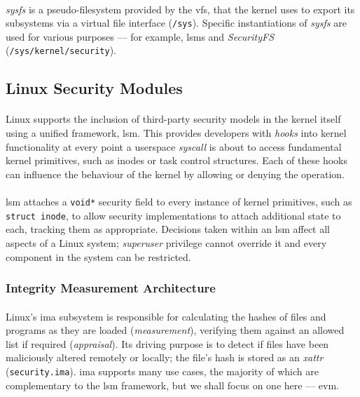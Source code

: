 \paragraph{} \textit{sysfs} is a pseudo-filesystem provided by the \acrshort{vfs}, that the kernel uses to export its subsystems via a virtual file interface (\texttt{/sys}). Specific instantiations of \textit{sysfs} are used for various purposes --- for example, \acrshort{lsm}s and \textit{SecurityFS} (\texttt{/sys/kernel/security}).



\subsection{Linux Security Modules}
\label{sec:lsm}

\paragraph{} Linux supports the inclusion of third-party security models in the kernel itself using a unified framework, \acrshort{lsm}. This provides developers with \textit{hooks} into kernel functionality at every point a userspace \textit{syscall} is about to access fundamental kernel primitives, such as inodes or task control structures. Each of these hooks can influence the behaviour of the kernel by allowing or denying the operation.

\paragraph{} \acrshort{lsm} attaches a \texttt{void*} security field to every instance of kernel primitives, such as \texttt{struct inode}, to allow security implementations to attach additional state to each, tracking them as appropriate. Decisions taken within an \acrshort{lsm} affect all aspects of a Linux system; \textit{superuser} privilege cannot override it and every component in the system can be restricted.


\subsubsection{Integrity Measurement Architecture}
\label{sec:ima}

\paragraph{} Linux's \acrshort{ima} subsystem is responsible for calculating the hashes of files and programs as they are loaded (\textit{measurement}), verifying them against an allowed list if required (\textit{appraisal}). Its driving purpose is to detect if files have been maliciously altered remotely or locally; the file's hash is stored as an \textit{\acrshort{xattr}} (\texttt{security.ima}). \acrshort{ima} supports many use cases, the majority of which are complementary to the \acrshort{lsm} framework, but we shall focus on one here --- \acrshort{evm}.


